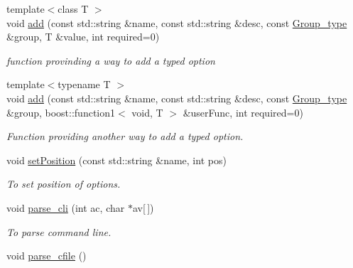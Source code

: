 \begin{DoxyCompactItemize}
{\footnotesize template$<$class T $>$ }\\void \hyperlink{classOptions_ae5f9d2285dbdc49173c70028c2175e46}{add} (const std::string \&name, const std::string \&desc, const \hyperlink{Options_8hpp_abca947614755a7e288afe5c44b07c98d}{Group\_\-type} \&group, T \&value, int required=0)
\begin{DoxyCompactList}\small\item\em function provinding a way to add a typed option \item\end{DoxyCompactList}\item 
{\footnotesize template$<$typename T $>$ }\\void \hyperlink{classOptions_ab5ef6835170eeb2b947c6bdf7df78a86}{add} (const std::string \&name, const std::string \&desc, const \hyperlink{Options_8hpp_abca947614755a7e288afe5c44b07c98d}{Group\_\-type} \&group, boost::function1$<$ void, T $>$ \&userFunc, int required=0)
\begin{DoxyCompactList}\small\item\em Function providing another way to add a typed option. \item\end{DoxyCompactList}\item 
void \hyperlink{classOptions_a9b4a10b364e83b45976720d2e4b3b5b8}{setPosition} (const std::string \&name, int pos)
\begin{DoxyCompactList}\small\item\em To set position of options. \item\end{DoxyCompactList}\item 
void \hyperlink{classOptions_aeccb885f4fda7fe5f7bc20672301ad40}{parse\_\-cli} (int ac, char $\ast$av\mbox{[}$\,$\mbox{]})
\begin{DoxyCompactList}\small\item\em To parse command line. \item\end{DoxyCompactList}\item 
\hypertarget{classOptions_a8022862d79476d98dd353e1d7f511885}{
void \hyperlink{classOptions_a8022862d79476d98dd353e1d7f511885}{parse\_\-cfile} ()}
\label{classOptions_a8022862d79476d98dd353e1d7f511885}


\end{DoxyCompactItemize}
